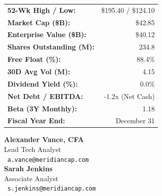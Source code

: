 \documentclass[10pt,a4paper]{scrartcl}
\begin{document}
\begin{minipage}[t]{0.32\textwidth}
    \vspace{0pt}
    \begin{tcolorbox}[calloutbox, title=\textcolor{NavyPrimary}{Market Data Snapshot}, colframe=NavyPrimary, colbacktitle=NavyPrimary, coltitle=white]
        \scriptsize
        \begin{tabular}{@{}lr@{}}
            \textbf{52-Wk High / Low:} & \$195.40 / \$124.10 \\
            \textbf{Market Cap (\$B):} & \$42.85 \\
            \textbf{Enterprise Value (\$B):} & \$40.12 \\
            \textbf{Shares Outstanding (M):} & 234.8 \\
            \textbf{Free Float (\%):} & 88.4\% \\
            \textbf{30D Avg Vol (M):} & 4.15 \\
            \textbf{Dividend Yield (\%):} & 0.0\% \\
            \textbf{Net Debt / EBITDA:} & -1.2x (Net Cash) \\
            \textbf{Beta (3Y Monthly):} & 1.18 \\
            \textbf{Fiscal Year End:} & December 31
        \end{tabular}
    \end{tcolorbox}

    \vspace{4pt}

    \begin{tcolorbox}[calloutbox, title=\textcolor{NavyPrimary}{Research Analysts}, colframe=NavyPrimary, colbacktitle=NavyPrimary, coltitle=white]
        \scriptsize
        \textbf{Alexander Vance, CFA} \\
        \textcolor{TextMuted}{Lead Tech Analyst} \\
        \faEnvelope \ \texttt{a.vance@meridiancap.com} \\[4pt]
        \textbf{Sarah Jenkins} \\
        \textcolor{TextMuted}{Associate Analyst} \\
        \faEnvelope \ \texttt{s.jenkins@meridiancap.com}
    \end{tcolorbox}
\end{minipage}%
\end{document}
